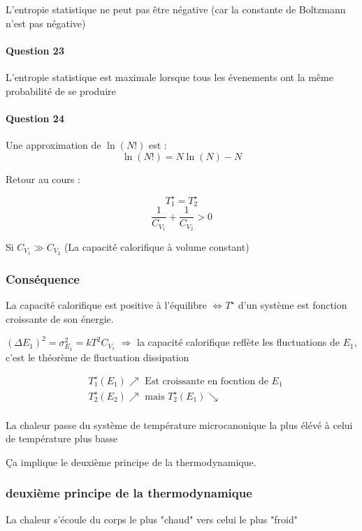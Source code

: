 \documentclass[12pt,a4paper]{report}
\begin{document}
L'entropie statistique ne peut pas être négative (car la constante de Boltzmann n'est pas négative)

\paragraph{Question 23}

L'entropie statistique est maximale lorsque tous les évenements ont la même probabilité de se produire

\paragraph{Question 24}

Une approximation de \(\ln(N!)\) est :
\[
	\ln(N!) = N \ln(N) - N
\]

Retour au cours :

\[
	T_1^\star = T_2^\star
\]
\[
	\dfrac{1}{C_{V_1}} + \dfrac{1}{C_{V_2}} > 0
\]


Si \(C_{V_1} \gg C_{V_2}\) (La capacité calorifique à volume constant)
\subsubsection{Conséquence}
	La capacité calorifique est positive à l'équilibre \(\Leftrightarrow T^\star\) d'un système est 	fonction croissante de son énergie.

	\((\Delta E_1)^2 = \sigma^2_{E_1} = kT^2 C_{V_1}\)
	\(\Rightarrow\) la capacité calorifique reflète les fluctuations de \(E_1\), c'est le théorème de 	fluctuation dissipation

\begin{align*}
	&T_1^\star (E_1) \nearrow \text{ Est croissante en focntion de } E_1\\
	&T_2^\star (E_2) \nearrow \text{ mais } T_2^\star (E_1) \searrow\\
\end{align*}

La chaleur passe du système de température microcanonique la plus élévé à celui de température plus basse

Ça implique le deuxième principe de la thermodynamique.
\subsubsection{deuxième principe de la thermodynamique}

	La chaleur s'écoule du corps le plus "chaud" vers celui le plus "froid"
\end{document}
